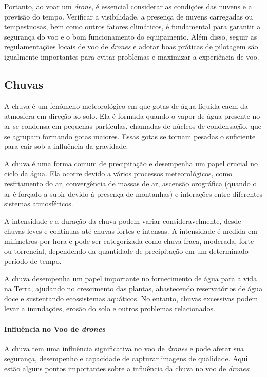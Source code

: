 \documentclass[a4paper, 12pt, onecolumn,singlespacing]{article}
\begin{document}
	Portanto, ao voar um \textit{drone}, é essencial considerar as condições das nuvens e a previsão do tempo. Verificar a visibilidade, a presença de nuvens carregadas ou tempestuosas, bem como outros fatores climáticos, é fundamental para garantir a segurança do voo e o bom funcionamento do equipamento. Além disso, seguir as regulamentações locais de voo de \textit{drones} e adotar boas práticas de pilotagem são igualmente importantes para evitar problemas e maximizar a experiência de voo.
	
	\subsection{Chuvas}
	
	A chuva é um fenômeno meteorológico em que gotas de água líquida caem da atmosfera em direção ao solo. Ela é formada quando o vapor de água presente no ar se condensa em pequenas partículas, chamadas de núcleos de condensação, que se agrupam formando gotas maiores. Essas gotas se tornam pesadas o suficiente para cair sob a influência da gravidade.
	
	A chuva é uma forma comum de precipitação e desempenha um papel crucial no ciclo da água. Ela ocorre devido a vários processos meteorológicos, como resfriamento do ar, convergência de massas de ar, ascensão orográfica (quando o ar é forçado a subir devido à presença de montanhas) e interações entre diferentes sistemas atmosféricos.
	
	A intensidade e a duração da chuva podem variar consideravelmente, desde chuvas leves e contínuas até chuvas fortes e intensas. A intensidade é medida em milímetros por hora e pode ser categorizada como chuva fraca, moderada, forte ou torrencial, dependendo da quantidade de precipitação em um determinado período de tempo.
	
	A chuva desempenha um papel importante no fornecimento de água para a vida na Terra, ajudando no crescimento das plantas, abastecendo reservatórios de água doce e sustentando ecossistemas aquáticos. No entanto, chuvas excessivas podem levar a inundações, erosão do solo e outros problemas relacionados.
		
	\paragraph{Influência no Voo de \textit{drones}}
	
	A chuva tem uma influência significativa no voo de \textit{drones} e pode afetar sua segurança, desempenho e capacidade de capturar imagens de qualidade. Aqui estão alguns pontos importantes sobre a influência da chuva no voo de \textit{drones}:
	
\end{document}
